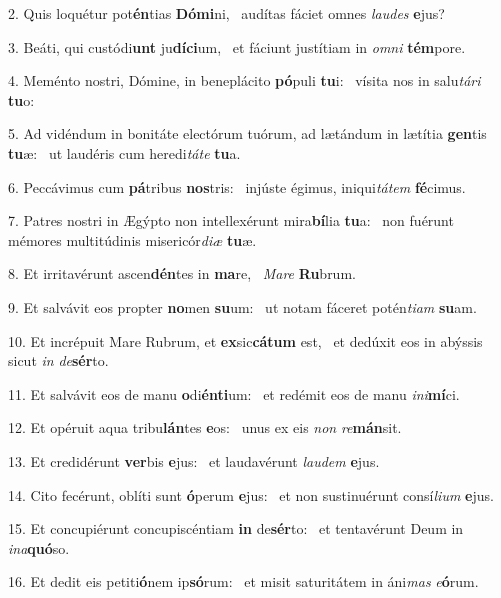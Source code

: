 2. Quis loquétur pot\textbf{én}tias \textbf{Dó}\textbf{mi}ni, \ast\  audítas fáciet omnes \textit{lau}\textit{des} \textbf{e}jus?\

3. Beáti, qui custódi\textbf{unt} ju\textbf{dí}\textbf{ci}um, \ast\  et fáciunt justítiam in \textit{om}\textit{ni} \textbf{tém}pore.\

4. Meménto nostri, Dómine, in beneplácito \textbf{pó}puli \textbf{tu}i: \ast\  vísita nos in salu\textit{tá}\textit{ri} \textbf{tu}o:\

5. Ad vidéndum in bonitáte electórum tuórum, ad lætándum in lætítia \textbf{gen}tis \textbf{tu}æ: \ast\  ut laudéris cum heredi\textit{tá}\textit{te} \textbf{tu}a.\

6. Peccávimus cum \textbf{pá}tribus \textbf{nos}tris: \ast\  injúste égimus, iniqui\textit{tá}\textit{tem} \textbf{fé}cimus.\

7. Patres nostri in Ægýpto non intellexérunt mira\textbf{bí}lia \textbf{tu}a: \ast\  non fuérunt mémores multitúdinis misericór\textit{di}\textit{æ} \textbf{tu}æ.\

8. Et irritavérunt ascen\textbf{dén}tes in \textbf{ma}re, \ast\  \textit{Ma}\textit{re} \textbf{Ru}brum.\

9. Et salvávit eos propter \textbf{no}men \textbf{su}um: \ast\  ut notam fáceret potén\textit{ti}\textit{am} \textbf{su}am.\

10. Et incrépuit Mare Rubrum, et \textbf{ex}sic\textbf{cá}\textbf{tum} est, \ast\  et dedúxit eos in abýssis sicut \textit{in} \textit{de}\textbf{sér}to.\

11. Et salvávit eos de manu \textbf{o}di\textbf{én}\textbf{ti}um: \ast\  et redémit eos de manu \textit{in}\textit{i}\textbf{mí}ci.\

12. Et opéruit aqua tribu\textbf{lán}tes \textbf{e}os: \ast\  unus ex eis \textit{non} \textit{re}\textbf{mán}sit.\

13. Et credidérunt \textbf{ver}bis \textbf{e}jus: \ast\  et laudavérunt \textit{lau}\textit{dem} \textbf{e}jus.\

14. Cito fecérunt, oblíti sunt \textbf{ó}perum \textbf{e}jus: \ast\  et non sustinuérunt consí\textit{li}\textit{um} \textbf{e}jus.\

15. Et concupiérunt concupiscéntiam \textbf{in} de\textbf{sér}to: \ast\  et tentavérunt Deum in \textit{in}\textit{a}\textbf{quó}so.\

16. Et dedit eis petiti\textbf{ó}nem ip\textbf{só}rum: \ast\  et misit saturitátem in áni\textit{mas} \textit{e}\textbf{ó}rum.\

